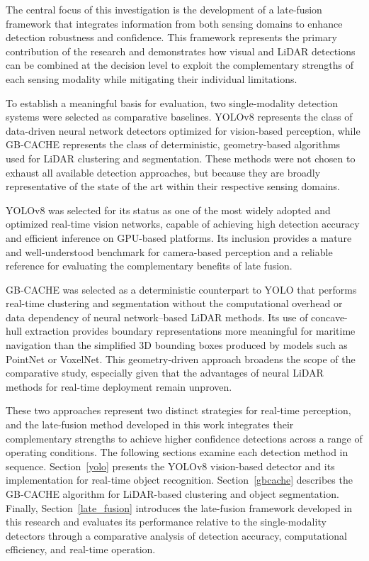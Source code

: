 \documentclass{erauthesis}
\begin{document}
The central focus of this investigation is the development of a late-fusion framework that integrates information from both sensing domains to enhance detection robustness and confidence.
This framework represents the primary contribution of the research and demonstrates how visual and LiDAR detections can be combined at the decision level to exploit the complementary strengths of each sensing modality while mitigating their individual limitations.

To establish a meaningful basis for evaluation, two single-modality detection systems were selected as comparative baselines.
YOLOv8 represents the class of data-driven neural network detectors optimized for vision-based perception, while GB-CACHE represents the class of deterministic, geometry-based algorithms used for LiDAR clustering and segmentation.
These methods were not chosen to exhaust all available detection approaches, but because they are broadly representative of the state of the art within their respective sensing domains.

YOLOv8 was selected for its status as one of the most widely adopted and optimized real-time vision networks, capable of achieving high detection accuracy and efficient inference on GPU-based platforms.
Its inclusion provides a mature and well-understood benchmark for camera-based perception and a reliable reference for evaluating the complementary benefits of late fusion.

GB-CACHE was selected as a deterministic counterpart to YOLO that performs real-time clustering and segmentation without the computational overhead or data dependency of neural network–based LiDAR methods.
Its use of concave-hull extraction provides boundary representations more meaningful for maritime navigation than the simplified 3D bounding boxes produced by models such as PointNet or VoxelNet.
This geometry-driven approach broadens the scope of the comparative study, especially given that the advantages of neural LiDAR methods for real-time deployment remain unproven.

These two approaches represent two distinct strategies for real-time perception, and the late-fusion method developed in this work integrates their complementary strengths to achieve higher confidence detections across a range of operating conditions.
The following sections examine each detection method in sequence.
Section~\ref{yolo} presents the YOLOv8 vision-based detector and its implementation for real-time object recognition.
Section~\ref{gbcache} describes the GB-CACHE algorithm for LiDAR-based clustering and object segmentation.
Finally, Section~\ref{late_fusion} introduces the late-fusion framework developed in this research and evaluates its performance relative to the single-modality detectors through a comparative analysis of detection accuracy, computational efficiency, and real-time operation.
\end{document}
